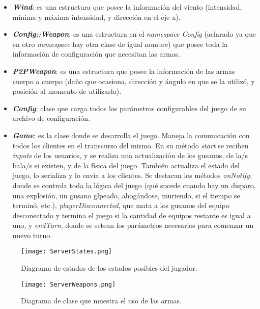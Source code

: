 \begin{itemize}
	\item \textbf{\textit{Wind}}: es una estructura que posee la información del viento (intensidad, mínima y máxima intensidad, y dirección en el eje x).
	
	\item \textbf{\textit{Config::Weapon}}: es una estructura en el \textit{namespace Config} (aclarado ya que en otro \textit{namespace} hay otra clase de igual nombre) que posee toda la información de configuración que necesitan las armas.
	
	\item \textbf{\textit{P2PWeapon}}: es una estructura que posee la información de las armas cuerpo a cuerpo (daño que ocasiona, dirección y ángulo en que se la utilizó, y posición al momento de utilizarla).
	
	\item \textbf{\textit{Config}}: clase que carga todos los parámetros configurables del juego de su archivo de configuración.
	
	\item \textbf{\textit{Game}}: es la clase donde se desarrolla el juego. Maneja la comunicación con todos los clientes en el transcurso del mismo. En su método \textit{start} se reciben \textit{inputs} de los usuarios, y se realiza una actualización de los gusanos, de la/s bala/s si existen, y de la física del juego. También actualiza el estado del juego, lo serializa y lo envía a los clientes. Se destacan los métodos \textit{onNotify}, donde se controla toda la lógica del juego (qué sucede cuando hay un disparo, una explosión, un gusano glpeado, ahogándose, muriendo, si el tiempo se terminó, etc.), \textit{playerDisconnected}, que mata a los gusanos del equipo desconectado y termina el juego si la cantidad de equipos restante es igual a uno, y \textit{endTurn}, donde se setean los parámetros necesarios para comenzar un nuevo turno.
\end{itemize}
\clearpage
\begin{sidewaysfigure}[!ht]
	\centering
	\texttt{[image: ServerStates.png]}
	\caption{Diagrama de estados de los estados posibles del jugador.}
	\label{im:serverState}
\end{sidewaysfigure}
\clearpage
\begin{sidewaysfigure}[!ht]
	\centering
	\texttt{[image: ServerWeapons.png]}
	\caption{Diagrama de clase que muestra el uso de las armas.}
	\label{im:serverWeapons}
\end{sidewaysfigure}
\clearpage
